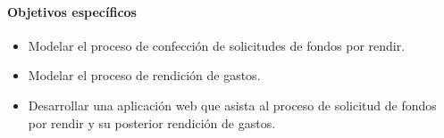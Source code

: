 \paragraph{Objetivos específicos} 

\begin{itemize}
	\item Modelar el proceso de confección de solicitudes de fondos por rendir.

	\item Modelar el proceso de rendición de gastos.

	\item Desarrollar una aplicación web que asista al proceso de solicitud de fondos por rendir y su posterior rendición de gastos.

\end{itemize}

